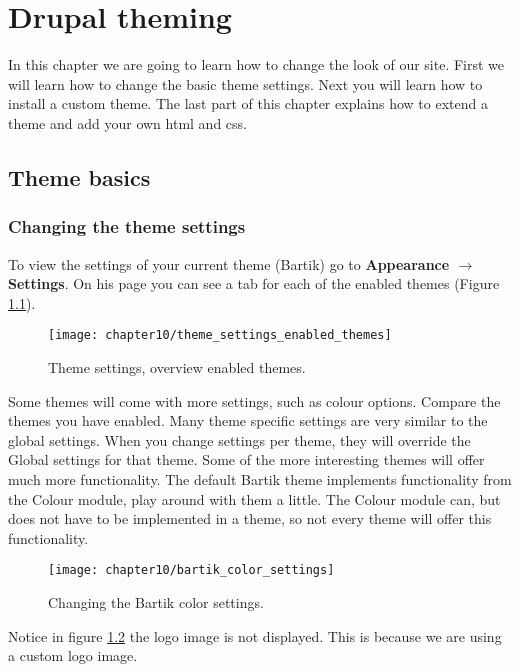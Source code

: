 \chapter{Drupal theming}

In this chapter we are going to learn how to change the look of our site. First we will learn how to change the basic theme settings. Next you will learn how to install a custom theme. The last part of this chapter explains how to extend a theme and add your own html and css.

\section{Theme basics}

\subsection{Changing the theme settings}

To view the settings of your current theme (Bartik) go to \textbf{Appearance $\rightarrow$ Settings}. On his page you can see a tab for each of the enabled themes (Figure \ref{fig:theme_settings_enabled_themes}).

\begin{figure}[H]
	\centering
	\texttt{[image: chapter10/theme\_settings\_enabled\_themes]}
	\caption{Theme settings, overview enabled themes.}
	\label{fig:theme_settings_enabled_themes}
\end{figure}

Some themes will come with more settings, such as colour options. Compare the themes you have enabled. Many theme specific settings are very similar to the global settings. When you change settings per theme, they will override the Global settings for that theme. Some of the more interesting themes will offer much more functionality. The default Bartik theme implements functionality from the Colour module, play around with them a little. The Colour module can, but does not have to be implemented in a theme, so not
every theme will offer this functionality.

\begin{figure}[H]
	\centering
	\texttt{[image: chapter10/bartik\_color\_settings]}
	\caption{Changing the Bartik color settings.}
	\label{fig:bartik_color_settings}
\end{figure}

Notice in figure \ref{fig:bartik_color_settings} the logo image is not displayed. This is because we are using a custom logo image.

